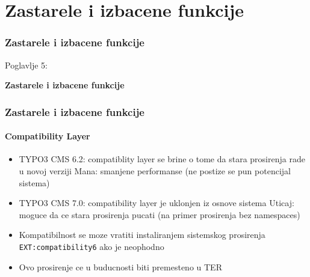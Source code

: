 %

\section{Zastarele i izbacene funkcije}
\begin{frame}[fragile]
	\frametitle{Zastarele i izbacene funkcije}

	\begin{center}\huge{Poglavlje 5:}\end{center}
	\begin{center}\huge{\color{typo3darkgrey}\textbf{Zastarele i izbacene funkcije}}\end{center}

\end{frame}


\begin{frame}[fragile]
	\frametitle{Zastarele i izbacene funkcije}
	\framesubtitle{Compatibility Layer}

	\begin{itemize}

		\item TYPO3 CMS 6.2: compatiblity layer se brine o tome da stara prosirenja rade u novoj verziji\newline
			\small
				Mana: smanjene performanse (ne postize se pun potencijal sistema)
			\normalsize

		\item TYPO3 CMS 7.0: compatibility layer je uklonjen iz osnove sistema\newline
			\small
				Uticaj: moguce da ce stara prosirenja pucati (na primer prosirenja bez namespaces)
			\normalsize

		\item Kompatibilnost se moze vratiti instaliranjem sistemskog prosirenja \texttt{EXT:compatibility6} ako je neophodno
		\item Ovo prosirenje ce u buducnosti biti premesteno u TER

	\end{itemize}

\end{frame}

